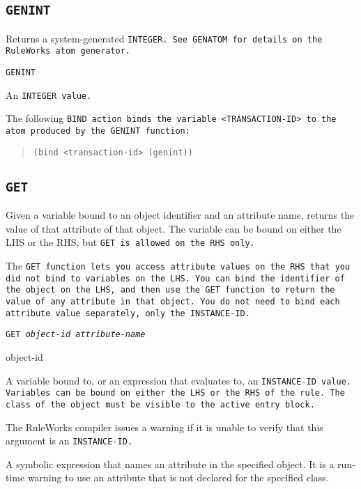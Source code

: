 \subsection{\tt{GENINT}}

Returns a system-generated \tt{INTEGER}. See \tt{GENATOM} for details
on the RuleWorks atom generator.

\Format

\tt{GENINT}

\ReturnValue

An \tt{INTEGER} value.

\Example

The following \tt{BIND} action binds the variable \tt{<TRANSACTION-ID>}
to the atom produced by the \tt{GENINT} function:

\begin{quote}
\begin{verbatim}
(bind <transaction-id> (genint))
\end{verbatim}
\end{quote}

\subsection{\tt{GET}}

Given a variable bound to an object identifier and an attribute name,
returns the value of that attribute of that object. The variable can
be bound on either the LHS or the RHS, but \tt{GET} is allowed on the
RHS only.

The \tt{GET} function lets you access attribute values on the RHS that
you did not bind to variables on the LHS. You can bind the identifier
of the object on the LHS, and then use the \tt{GET} function to return
the value of any attribute in that object.  You do not need to bind
each attribute value separately, only the \tt{INSTANCE-ID}.

\Format

\tt{GET} \it{object-id} \ct\it{attribute-name}

\begin{arguments}
\item[object-id]

  A variable bound to, or an expression that evaluates to, an
  \tt{INSTANCE-ID} value. Variables can be bound on either the LHS or
  the RHS of the rule. The class of the object must be visible to the
  active entry block.

  The RuleWorks compiler issues a warning if it is unable to verify
  that this argument is an \tt{INSTANCE-ID}.

\item[\ct{attribute-name}]

  A symbolic expression that names an attribute in the specified
  object. It is a run-time warning to use an attribute that is not
  declared for the specified class.
\end{arguments}

